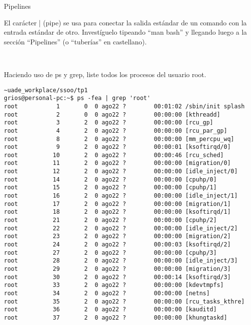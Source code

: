 \begin{section}{Pipelines}


\begin{quoting}
El carácter | (pipe) se usa para conectar la salida estándar de un comando con la entrada estándar de
otro. Investíguelo tipeando “man bash” y llegando luego a la sección “Pipelines” (o “tuberías” en castellano).
\end{quoting}
\\

\begin{quoting}
Haciendo uso de ps y grep, liste todos los procesos del usuario root.
\end{quoting}

\begin{lstlisting}[style=Ubuntu]
~uade_workplace/ssoo/tp1
grios@personal-pc:~$ ps -fea | grep 'root'
root           1       0  0 ago22 ?        00:01:02 /sbin/init splash
root           2       0  0 ago22 ?        00:00:00 [kthreadd]
root           3       2  0 ago22 ?        00:00:00 [rcu_gp]
root           4       2  0 ago22 ?        00:00:00 [rcu_par_gp]
root           8       2  0 ago22 ?        00:00:00 [mm_percpu_wq]
root           9       2  0 ago22 ?        00:00:01 [ksoftirqd/0]
root          10       2  0 ago22 ?        00:00:46 [rcu_sched]
root          11       2  0 ago22 ?        00:00:00 [migration/0]
root          12       2  0 ago22 ?        00:00:00 [idle_inject/0]
root          14       2  0 ago22 ?        00:00:00 [cpuhp/0]
root          15       2  0 ago22 ?        00:00:00 [cpuhp/1]
root          16       2  0 ago22 ?        00:00:00 [idle_inject/1]
root          17       2  0 ago22 ?        00:00:00 [migration/1]
root          18       2  0 ago22 ?        00:00:00 [ksoftirqd/1]
root          21       2  0 ago22 ?        00:00:00 [cpuhp/2]
root          22       2  0 ago22 ?        00:00:00 [idle_inject/2]
root          23       2  0 ago22 ?        00:00:00 [migration/2]
root          24       2  0 ago22 ?        00:00:03 [ksoftirqd/2]
root          27       2  0 ago22 ?        00:00:00 [cpuhp/3]
root          28       2  0 ago22 ?        00:00:00 [idle_inject/3]
root          29       2  0 ago22 ?        00:00:00 [migration/3]
root          30       2  0 ago22 ?        00:00:14 [ksoftirqd/3]
root          33       2  0 ago22 ?        00:00:00 [kdevtmpfs]
root          34       2  0 ago22 ?        00:00:00 [netns]
root          35       2  0 ago22 ?        00:00:00 [rcu_tasks_kthre]
root          36       2  0 ago22 ?        00:00:00 [kauditd]
root          37       2  0 ago22 ?        00:00:00 [khungtaskd]

\end{lstlisting}
\end{section}
